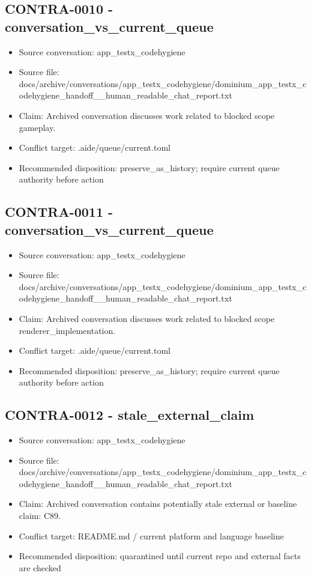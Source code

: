 \documentclass[11pt,a4paper]{report}
\begin{document}
\subsection{CONTRA-0010 - conversation\_vs\_current\_queue}

\begin{itemize}
\item Source conversation: app\_testx\_codehygiene
\item Source file: docs/archive/conversations/app\_testx\_codehygiene/dominium\_app\_testx\_codehygiene\_handoff\_\_human\_readable\_chat\_report.txt
\item Claim: Archived conversation discusses work related to blocked scope gameplay.
\item Conflict target: .aide/queue/current.toml
\item Recommended disposition: preserve\_as\_history; require current queue authority before action
\end{itemize}

\subsection{CONTRA-0011 - conversation\_vs\_current\_queue}

\begin{itemize}
\item Source conversation: app\_testx\_codehygiene
\item Source file: docs/archive/conversations/app\_testx\_codehygiene/dominium\_app\_testx\_codehygiene\_handoff\_\_human\_readable\_chat\_report.txt
\item Claim: Archived conversation discusses work related to blocked scope renderer\_implementation.
\item Conflict target: .aide/queue/current.toml
\item Recommended disposition: preserve\_as\_history; require current queue authority before action
\end{itemize}

\subsection{CONTRA-0012 - stale\_external\_claim}

\begin{itemize}
\item Source conversation: app\_testx\_codehygiene
\item Source file: docs/archive/conversations/app\_testx\_codehygiene/dominium\_app\_testx\_codehygiene\_handoff\_\_human\_readable\_chat\_report.txt
\item Claim: Archived conversation contains potentially stale external or baseline claim: C89.
\item Conflict target: README.md / current platform and language baseline
\item Recommended disposition: quarantined until current repo and external facts are checked
\end{itemize}
\end{document}

